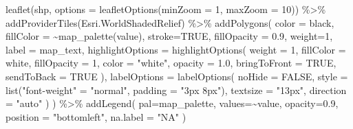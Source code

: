 \documentclass[
]{book}
\newenvironment{Shaded}{\begin{snugshade}}{\end{snugshade}}
\newcommand{\AttributeTok}[1]{\textcolor[rgb]{0.77,0.63,0.00}{#1}}
\newcommand{\ConstantTok}[1]{\textcolor[rgb]{0.00,0.00,0.00}{#1}}
\newcommand{\DecValTok}[1]{\textcolor[rgb]{0.00,0.00,0.81}{#1}}
\newcommand{\FloatTok}[1]{\textcolor[rgb]{0.00,0.00,0.81}{#1}}
\newcommand{\FunctionTok}[1]{\textcolor[rgb]{0.00,0.00,0.00}{#1}}
\newcommand{\NormalTok}[1]{#1}
\newcommand{\OtherTok}[1]{\textcolor[rgb]{0.56,0.35,0.01}{#1}}
\newcommand{\SpecialCharTok}[1]{\textcolor[rgb]{0.00,0.00,0.00}{#1}}
\newcommand{\StringTok}[1]{\textcolor[rgb]{0.31,0.60,0.02}{#1}}
\begin{document}
\begin{Shaded}
\begin{Highlighting}[]
    \FunctionTok{leaflet}\NormalTok{(shp, }\AttributeTok{options =} \FunctionTok{leafletOptions}\NormalTok{(}\AttributeTok{minZoom =} \DecValTok{1}\NormalTok{, }
                                                \AttributeTok{maxZoom =} \DecValTok{10}\NormalTok{)) }\SpecialCharTok{\%\textgreater{}\%} 
        \FunctionTok{addProviderTiles}\NormalTok{(}\StringTok{\textquotesingle{}Esri.WorldShadedRelief\textquotesingle{}}\NormalTok{) }\SpecialCharTok{\%\textgreater{}\%}
        \FunctionTok{addPolygons}\NormalTok{( }
          \AttributeTok{color =} \StringTok{\textquotesingle{}black\textquotesingle{}}\NormalTok{,}
          \AttributeTok{fillColor =} \SpecialCharTok{\textasciitilde{}}\FunctionTok{map\_palette}\NormalTok{(value), }
          \AttributeTok{stroke=}\ConstantTok{TRUE}\NormalTok{, }
          \AttributeTok{fillOpacity =} \FloatTok{0.9}\NormalTok{, }
          \AttributeTok{weight=}\DecValTok{1}\NormalTok{,}
          \AttributeTok{label =}\NormalTok{ map\_text,}
          \AttributeTok{highlightOptions =} \FunctionTok{highlightOptions}\NormalTok{(}
            \AttributeTok{weight =} \DecValTok{1}\NormalTok{,}
            \AttributeTok{fillColor =} \StringTok{\textquotesingle{}white\textquotesingle{}}\NormalTok{,}
            \AttributeTok{fillOpacity =} \DecValTok{1}\NormalTok{,}
            \AttributeTok{color =} \StringTok{"white"}\NormalTok{,}
            \AttributeTok{opacity =} \FloatTok{1.0}\NormalTok{,}
            \AttributeTok{bringToFront =} \ConstantTok{TRUE}\NormalTok{,}
            \AttributeTok{sendToBack =} \ConstantTok{TRUE}
\NormalTok{          ),}
          \AttributeTok{labelOptions =} \FunctionTok{labelOptions}\NormalTok{( }
            \AttributeTok{noHide =} \ConstantTok{FALSE}\NormalTok{,}
            \AttributeTok{style =} \FunctionTok{list}\NormalTok{(}\StringTok{"font{-}weight"} \OtherTok{=} \StringTok{"normal"}\NormalTok{, }\AttributeTok{padding =} \StringTok{"3px 8px"}\NormalTok{), }
            \AttributeTok{textsize =} \StringTok{"13px"}\NormalTok{, }
            \AttributeTok{direction =} \StringTok{"auto"}
\NormalTok{          )}
\NormalTok{        ) }\SpecialCharTok{\%\textgreater{}\%} 
        \FunctionTok{addLegend}\NormalTok{( }\AttributeTok{pal=}\NormalTok{map\_palette, }\AttributeTok{values=}\SpecialCharTok{\textasciitilde{}}\NormalTok{value, }\AttributeTok{opacity=}\FloatTok{0.9}\NormalTok{, }\AttributeTok{position =} \StringTok{"bottomleft"}\NormalTok{, }\AttributeTok{na.label =} \StringTok{"NA"}\NormalTok{ )}
\end{Highlighting}
\end{Shaded}
\end{document}
